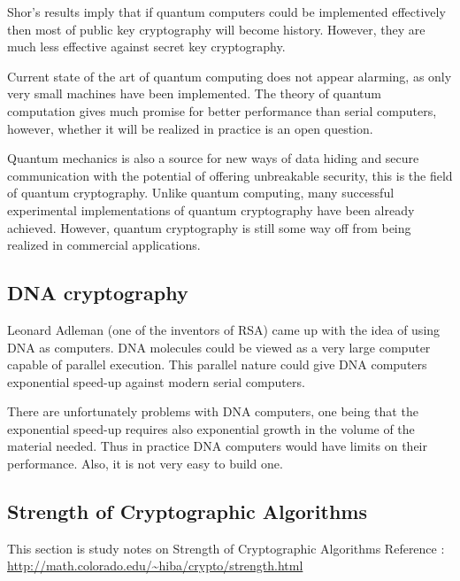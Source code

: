\documentclass[12pt]{article}
\begin{document}
Shor's results imply that if quantum computers could be implemented effectively then most of public key cryptography will become history. However, they are much less effective against secret key cryptography.

Current state of the art of quantum computing does not appear alarming, as only very small machines have been implemented. The theory of quantum computation gives much promise for better performance than serial computers, however, whether it will be realized in practice is an open question.

Quantum mechanics is also a source for new ways of data hiding and secure communication with the potential of offering unbreakable security, this is the field of quantum cryptography. Unlike quantum computing, many successful experimental implementations of quantum cryptography have been already achieved. However, quantum cryptography is still some way off from being realized in commercial applications.

\subsection{DNA cryptography}
Leonard Adleman (one of the inventors of RSA) came up with the idea of using DNA as
computers. DNA molecules could be viewed as a very large computer capable of parallel execution. This parallel nature could give DNA computers exponential speed-up against modern serial computers.

There are unfortunately problems with DNA computers, one being that the exponential speed-up requires also exponential growth in the volume of the material needed. Thus in practice DNA computers would have limits
on their performance. Also, it is not very easy to build one.














%
%
\pagebreak
\vspace*{\fill}
\begin{center}
\section{Strength of Cryptographic Algorithms }
This section is study notes on Strength of Cryptographic Algorithms 
Reference : 	\url {http://math.colorado.edu/~hiba/crypto/strength.html}
\end{center}
\vspace*{\fill}
\pagebreak
\end{document}

